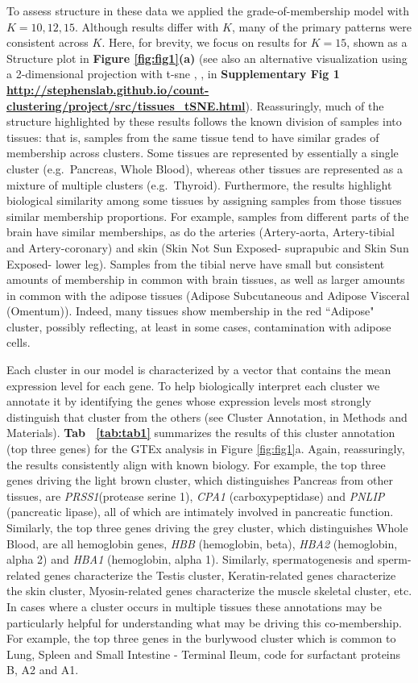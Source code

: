 To assess structure in these data we applied the grade-of-membership model with $K=10,12,15$. Although results differ with $K$, many of the primary patterns were consistent across $K$. Here, for brevity, we focus on results for $K=15$, shown as a Structure plot in \textbf{Figure \ref{fig:fig1}(a)} (see also an alternative visualization using a 2-dimensional projection with t-sne \cite{Maaten2008}, \cite{Maaten2014}, in \textbf{Supplementary Fig 1 \url{http://stephenslab.github.io/count-clustering/project/src/tissues_tSNE.html}}). Reassuringly, much of the structure highlighted by these results follows the known division of samples into tissues: that is, samples from the same tissue tend to have similar grades of membership across clusters. Some tissues are represented by essentially a single cluster (e.g.~Pancreas, Whole Blood), whereas other tissues are represented as a mixture of multiple clusters (e.g.~Thyroid). Furthermore, the results highlight biological similarity among some tissues by assigning samples from those tissues similar membership proportions. For example, samples from different parts of the brain have similar memberships, as do the arteries (Artery-aorta, Artery-tibial and Artery-coronary) and skin (Skin Not Sun Exposed- suprapubic and Skin Sun Exposed- lower leg). Samples from the tibial nerve have small but consistent amounts of membership in common with brain tissues, as well as larger amounts in common with the adipose tissues (Adipose Subcutaneous and Adipose Visceral (Omentum)). Indeed, many 
tissues show membership in the red ``Adipose" cluster, possibly reflecting, at least in some cases, contamination with adipose cells.
 
Each cluster in our model is characterized by a vector that contains the mean expression level for each gene. To help biologically interpret each cluster we annotate it by identifying the genes whose expression levels most strongly distinguish that cluster from the others (see Cluster Annotation, in Methods and Materials).  \textbf{Tab ~\ref{tab:tab1}} summarizes the results of this cluster annotation (top three genes) for the GTEx analysis in Figure \ref{fig:fig1}a.  Again, reassuringly, the results consistently align with known biology. For example,  the top three genes driving the light brown cluster, which distinguishes Pancreas from other tissues, are  \textit{PRSS1}(protease serine 1), \textit{CPA1} (carboxypeptidase) and \textit{PNLIP} (pancreatic lipase), all of which are intimately involved in pancreatic function. Similarly, the top three genes driving the grey cluster, which distinguishes Whole Blood, are all hemoglobin genes, \textit{HBB} (hemoglobin, beta), \textit{HBA2} (hemoglobin, alpha 2) and \textit{HBA1} (hemoglobin, alpha 1).  Similarly, spermatogenesis and sperm-related genes characterize the Testis cluster, Keratin-related genes characterize the skin cluster, Myosin-related genes characterize the muscle skeletal cluster, etc. In cases where a cluster occurs in multiple tissues these annotations may be particularly helpful for understanding what may be driving this co-membership. For example, the top three genes in the  burlywood cluster  which is common to Lung, Spleen and Small Intestine - Terminal Ileum, code for surfactant proteins B, A2 and A1.


